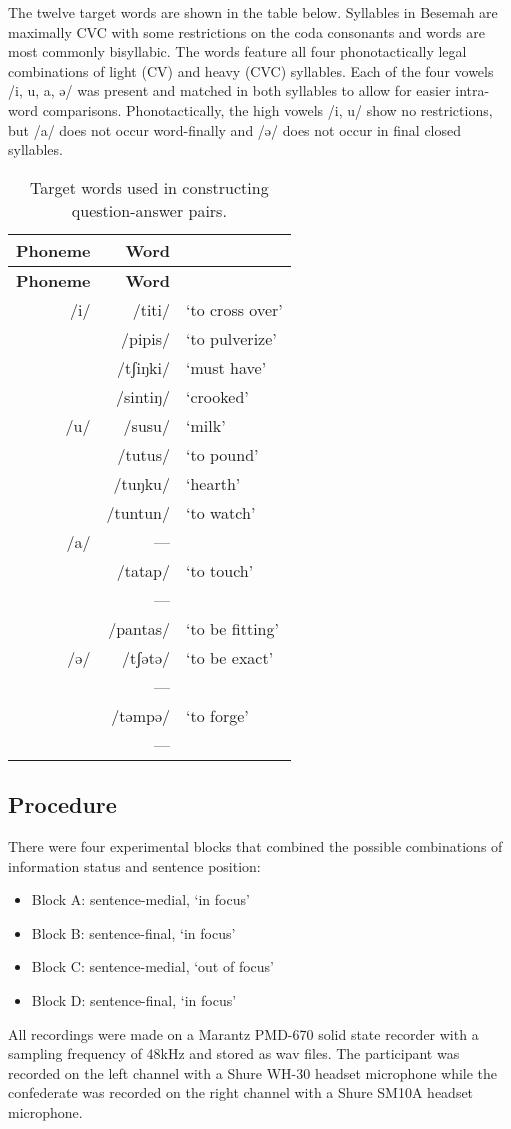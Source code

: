 \documentclass[]{article}
\providecommand{\tightlist}{%
  \setlength{\itemsep}{0pt}\setlength{\parskip}{0pt}}
\begin{document}
The twelve target words are shown in the table below. Syllables in
Besemah are maximally CVC with some restrictions on the coda consonants
and words are most commonly bisyllabic. The words feature all four
phonotactically legal combinations of light (CV) and heavy (CVC)
syllables. Each of the four vowels /i, u, a, ə/ was present and matched
in both syllables to allow for easier intra-word comparisons.
Phonotactically, the high vowels /i, u/ show no restrictions, but /a/
does not occur word-finally and /ə/ does not occur in final closed
syllables.

\begin{longtable}[]{@{}rrl@{}}
\caption{Target words used in constructing question-answer
pairs.}\tabularnewline
\toprule
\textbf{Phoneme} & \textbf{Word} &\tabularnewline
\midrule
\endfirsthead
\toprule
\textbf{Phoneme} & \textbf{Word} &\tabularnewline
\midrule
\endhead
/i/ & /titi/ & `to cross over'\tabularnewline
& /pipis/ & `to pulverize'\tabularnewline
& /tʃiŋki/ & `must have'\tabularnewline
& /sintiŋ/ & `crooked'\tabularnewline
/u/ & /susu/ & `milk'\tabularnewline
& /tutus/ & `to pound'\tabularnewline
& /tuŋku/ & `hearth'\tabularnewline
& /tuntun/ & `to watch'\tabularnewline
/a/ & --- &\tabularnewline
& /tatap/ & `to touch'\tabularnewline
& --- &\tabularnewline
& /pantas/ & `to be fitting'\tabularnewline
/ə/ & /tʃətə/ & `to be exact'\tabularnewline
& --- &\tabularnewline
& /təmpə/ & `to forge'\tabularnewline
& --- &\tabularnewline
\bottomrule
\end{longtable}

\subsection{Procedure}\label{procedure}

There were four experimental blocks that combined the possible
combinations of information status and sentence position:

\begin{itemize}
\tightlist
\item
  Block A: sentence-medial, `in focus'
\item
  Block B: sentence-final, `in focus'
\item
  Block C: sentence-medial, `out of focus'
\item
  Block D: sentence-final, `in focus'
\end{itemize}

All recordings were made on a Marantz PMD-670 solid state recorder with
a sampling frequency of 48kHz and stored as wav files. The participant
was recorded on the left channel with a Shure WH-30 headset microphone
while the confederate was recorded on the right channel with a Shure
SM10A headset microphone.
\end{document}
